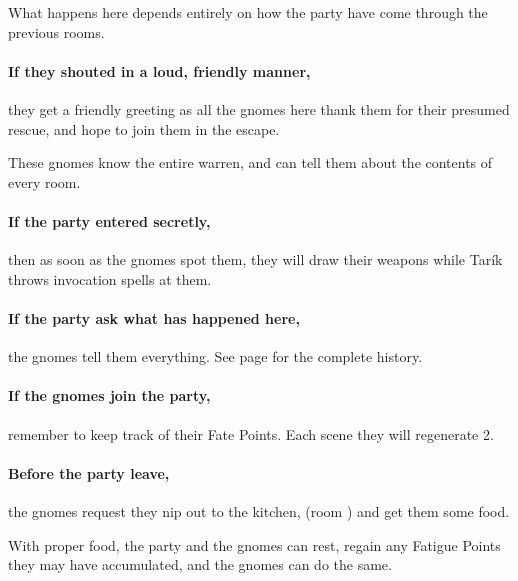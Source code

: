 \begin{multicols}{2}


What happens here depends entirely on how the party have come through the previous rooms.

\paragraph{If they shouted in a loud, friendly manner,}
they get a friendly greeting as all the gnomes here thank them for their presumed rescue, and hope to join them in the escape.

These gnomes know the entire warren, and can tell them about the contents of every room.

\paragraph{If the party entered secretly,}
then as soon as the gnomes spot them, they will draw their weapons while Tar\'ik throws invocation spells at them.

\paragraph{If the party ask what has happened here,}
the gnomes tell them everything.
See page \pageref{invasionhistory} for the complete history.

\paragraph{If the gnomes join the party,}
remember to keep track of their Fate Points.
Each scene they will regenerate 2.

\setcounter{enc}{\value{list}}
\addtocounter{enc}{1}

\paragraph{Before the party leave,}
the gnomes request they nip out to the kitchen, (room ) and get them some food.

With proper food, the party and the gnomes can rest, regain any Fatigue Points they may have accumulated, and the gnomes can do the same.





\end{multicols}
